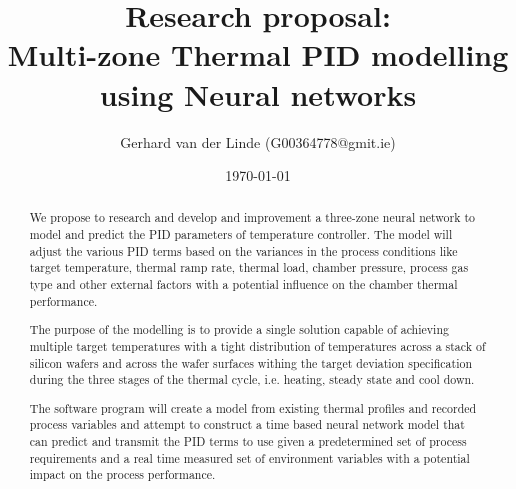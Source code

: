 

\title{Research proposal: \\ Multi-zone Thermal PID modelling using Neural networks}
\author{Gerhard van der Linde (G00364778@gmit.ie)}
\date{\today}




  \maketitle

  \begin{abstract}
    We propose to research and develop and improvement a three-zone neural
    network to model and predict the PID parameters of temperature controller. 
    The model will adjust the various PID terms based on the variances in the 
    process conditions like target temperature, thermal ramp rate, thermal load, 
    chamber pressure, process gas type and other external factors with a 
    potential influence on the chamber thermal performance.

    The purpose of the modelling is to provide a single solution capable of 
    achieving multiple target temperatures with a tight distribution of 
    temperatures across a stack of silicon wafers and across the wafer 
    surfaces withing the target deviation specification during the three stages 
    of the thermal cycle, i.e. heating, steady state and cool down.   
    
    The software program will create a model from existing thermal profiles and 
    recorded process variables and attempt to construct a time based neural network 
    model that can predict and transmit the PID terms to use given a predetermined 
    set of process requirements and a real time measured set of environment variables
    with a potential impact on the process performance.

  \end{abstract}

